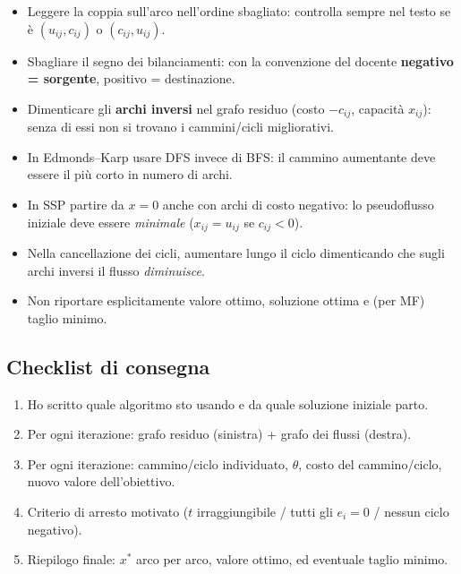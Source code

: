 \documentclass[11pt,a4paper]{article}
\begin{document}
\begin{tcolorbox}[colback=neg!7,colframe=neg!60!black,title=Errori che costano punti]
\begin{itemize}[nosep]
  \item Leggere la coppia sull'arco nell'ordine sbagliato: controlla sempre nel testo se è
        $(u_{ij},c_{ij})$ o $(c_{ij},u_{ij})$.
  \item Sbagliare il segno dei bilanciamenti: con la convenzione del docente
        \textbf{negativo = sorgente}, positivo = destinazione.
  \item Dimenticare gli \textbf{archi inversi} nel grafo residuo (costo $-c_{ij}$, capacità $x_{ij}$):
        senza di essi non si trovano i cammini/cicli migliorativi.
  \item In Edmonds--Karp usare DFS invece di BFS: il cammino aumentante deve essere il più corto
        in numero di archi.
  \item In SSP partire da $x=0$ anche con archi di costo negativo: lo pseudoflusso iniziale
        deve essere \emph{minimale} ($x_{ij}=u_{ij}$ se $c_{ij}<0$).
  \item Nella cancellazione dei cicli, aumentare lungo il ciclo dimenticando che sugli archi
        inversi il flusso \emph{diminuisce}.
  \item Non riportare esplicitamente valore ottimo, soluzione ottima e (per MF) taglio minimo.
\end{itemize}
\end{tcolorbox}

\subsection*{Checklist di consegna}
\begin{enumerate}[nosep]
  \item Ho scritto quale algoritmo sto usando e da quale soluzione iniziale parto.
  \item Per ogni iterazione: grafo residuo (sinistra) + grafo dei flussi (destra).
  \item Per ogni iterazione: cammino/ciclo individuato, $\theta$, costo del cammino/ciclo,
        nuovo valore dell'obiettivo.
  \item Criterio di arresto motivato ($t$ irraggiungibile / tutti gli $e_i=0$ / nessun ciclo negativo).
  \item Riepilogo finale: $x^\ast$ arco per arco, valore ottimo, ed eventuale taglio minimo.
\end{enumerate}
\end{document}
